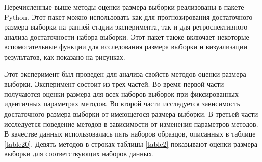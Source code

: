 Перечисленные выше методы оценки размера выборки реализованы в пакете Python. Этот пакет можно использовать как для прогнозирования достаточного размера выборки на ранней стадии эксперимента, так и для ретроспективного анализа достаточности набора выборки. Этот пакет также включает некоторые вспомогательные функции для исследования размера выборки и визуализации результатов, как показано на рисунках.

Этот эксперимент был проведен для анализа свойств методов оценки размера выборки. Эксперимент состоит из трех частей. Во время первой части получаются оценки размера для всех наборов выборок при фиксированных идентичных параметрах методов. Во второй части исследуется зависимость достаточного размера выборки от имеющегося размера выборки. В третьей части исследуется поведение методов в зависимости от изменения параметров методов. В качестве данных использовались пять наборов образцов, описанных в таблице \ref{table20}. Девять методов в строках таблицы \ref{table2} показывают оценки размера выборки для соответствующих наборов данных.
 
\begin{table}[!hbp]
\centering
\caption{Эксперимент по оценке размера выборки для различных наборов выборок}
\label{table2}
\end{table}

